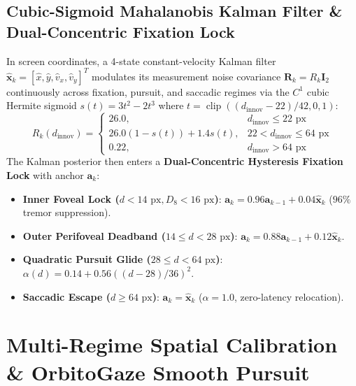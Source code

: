 \documentclass[twocolumn,10pt]{article}
\begin{document}
\subsection{Cubic-Sigmoid Mahalanobis Kalman Filter \& Dual-Concentric Fixation Lock}
In screen coordinates, a 4-state constant-velocity Kalman filter $\hat{\mathbf{x}}_k = [\hat{x}, \hat{y}, \hat{v}_x, \hat{v}_y]^T$ modulates its measurement noise covariance $\mathbf{R}_k = R_k \mathbf{I}_2$ continuously across fixation, pursuit, and saccadic regimes via the $C^1$ cubic Hermite sigmoid $s(t) = 3t^2 - 2t^3$ where $t = \operatorname{clip}((d_{\text{innov}} - 22)/42, 0, 1)$:
\begin{equation}
R_k(d_{\text{innov}}) = \begin{cases} 26.0, & d_{\text{innov}} \le 22\text{ px} \\ 26.0(1 - s(t)) + 1.4 s(t), & 22 < d_{\text{innov}} \le 64\text{ px} \\ 0.22, & d_{\text{innov}} > 64\text{ px} \end{cases}
\end{equation}
The Kalman posterior then enters a \textbf{Dual-Concentric Hysteresis Fixation Lock} with anchor $\mathbf{a}_k$:
\begin{itemize}
    \item \textbf{Inner Foveal Lock ($d < 14\text{ px}, D_8 < 16\text{ px}$)}: $\mathbf{a}_k = 0.96\mathbf{a}_{k-1} + 0.04\hat{\mathbf{x}}_k$ ($96\%$ tremor suppression).
    \item \textbf{Outer Perifoveal Deadband ($14 \le d < 28\text{ px}$)}: $\mathbf{a}_k = 0.88\mathbf{a}_{k-1} + 0.12\hat{\mathbf{x}}_k$.
    \item \textbf{Quadratic Pursuit Glide ($28 \le d < 64\text{ px}$)}: $\alpha(d) = 0.14 + 0.56((d - 28)/36)^2$.
    \item \textbf{Saccadic Escape ($d \ge 64\text{ px}$)}: $\mathbf{a}_k = \hat{\mathbf{x}}_k$ ($\alpha = 1.0$, zero-latency relocation).
\end{itemize}

\section{Multi-Regime Spatial Calibration \& OrbitoGaze Smooth Pursuit}
\label{sec:calibration}
\end{document}
